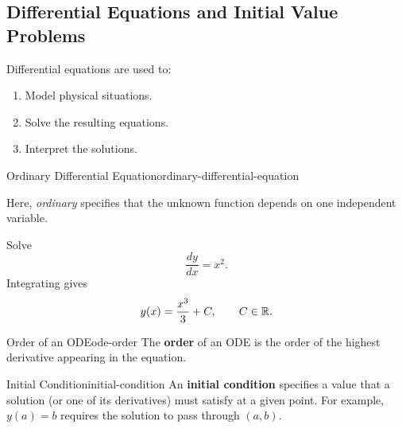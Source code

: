 \subsection{Differential Equations and Initial Value Problems}

Differential equations are used to:
\begin{enumerate}
  \item Model physical situations.
  \item Solve the resulting equations.
  \item Interpret the solutions.
\end{enumerate}

\begin{definition}{Ordinary Differential Equation}{ordinary-differential-equation}
  \begin{center}
  \end{center}
  Here, \emph{ordinary} specifies that the unknown function depends on one independent variable.
\end{definition}

\begin{example}
  Solve
  \[
    \frac{dy}{dx}=x^2.
  \]
  Integrating gives
  \[
    y(x)=\frac{x^3}{3}+C, \qquad C\in\mathbb{R}.
  \]
\end{example}

\begin{definition}{Order of an ODE}{ode-order}
  The \textbf{order} of an ODE is the order of the highest derivative appearing in the equation.
\end{definition}

\begin{definition}{Initial Condition}{initial-condition}
  An \textbf{initial condition} specifies a value that a solution (or one of its derivatives) must satisfy at a given point. For example, $y(a)=b$ requires the solution to pass through $(a,b)$.
\end{definition}

